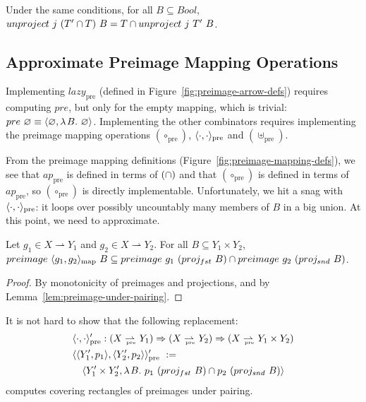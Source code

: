 \documentclass[preprint]{sigplanconf}
\newcommand{\pto}{\rightharpoonup}
\newcommand{\arrowlazy}{\ensuremath{lazy}}
\newcommand{\map}{_\mathrm{map}}
\newcommand{\pre}{_\mathrm{pre}}
\newcommand{\lazypre}{\arrowlazy\pre}
\newcommand{\prepto}{\pto_{\mspace{-19mu}\pre}}
\begin{document}
\begin{corollary}
Under the same conditions, for all $B \subseteq Bool$, $unproject~j~(T' \cap T)~B = T \cap unproject~j~T'~B$.
\end{corollary}

\subsection{Approximate Preimage Mapping Operations}

Implementing $\lazypre$ (defined in Figure~\ref{fig:preimage-arrow-defs}) requires computing $pre$, but only for the empty mapping, which is trivial: $pre~\varnothing \equiv \langle{\varnothing,\lambda\mspace{2mu}{B}\ldotp\,\varnothing}\rangle$.
Implementing the other combinators requires implementing the preimage mapping operations $(\circ\pre)$, $\pair{\cdot,\cdot}\pre$ and $(\uplus\pre)$.

From the preimage mapping definitions (Figure~\ref{fig:preimage-mapping-defs}), we see that $ap\pre$ is defined in terms of $(\cap)$ and that $(\circ\pre)$ is defined in terms of $ap\pre$, so $(\circ\pre)$ is directly implementable.
Unfortunately, we hit a snag with $\pair{\cdot,\cdot}\pre$: it loops over possibly uncountably many members of $B$ in a big union.
At this point, we need to approximate.

\begin{theorem}
Let $g_1 \in X \pto Y_1$ and $g_2 \in X \pto Y_2$.
For all $B \subseteq Y_1 \times Y_2$, $preimage~\pair{g_1,g_2}\map~B \subseteq preimage~g_1~(proj_{fst}~B) \i preimage~g_2~(proj_{snd}~B)$.
\end{theorem}
\begin{proof}
By monotonicity of preimages and projections, and by Lemma~\ref{lem:preimage-under-pairing}.
\end{proof}

It is not hard to show that the following replacement:
\begin{equation}
\begin{aligned}
	&\pair{\cdot,\cdot}\pre' : (X \prepto Y_1) \tto (X \prepto Y_2) \tto (X \prepto Y_1 \times Y_2) \\
	&\pair{\pair{Y_1',p_1},\pair{Y_2',p_2}}\pre' \ := \ \\
	&\tab\pair{Y_1' \times Y_2',\fun{B}{p_1~(proj_{fst}~B) \i p_2~(proj_{snd}~B)}}
\end{aligned}
\end{equation}
computes covering rectangles of preimages under pairing.
\end{document}
